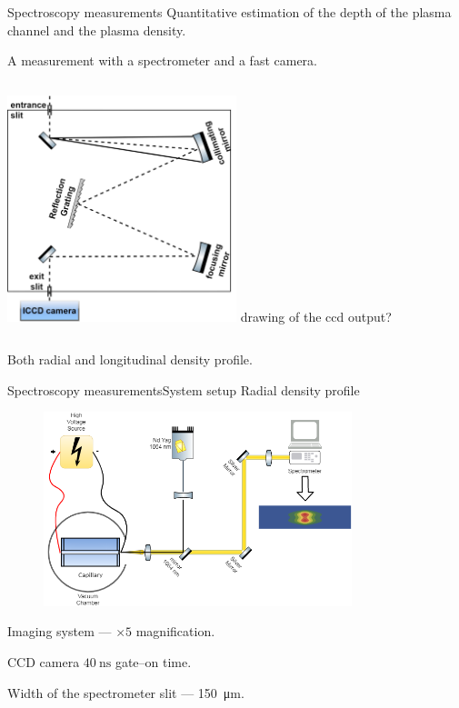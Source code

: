 \documentclass[]{beamer}
\begin{document}
  \begin{frame}{Spectroscopy measurements}
    Quantitative estimation of the depth of the plasma channel and the plasma density.

    A measurement with a spectrometer and a fast camera.
    \begin{columns}
          \includegraphics[width=0.5\textwidth]{figures/results/spectro/spectrometer.png}
      drawing of the ccd output?
    \end{columns}
    Both radial and longitudinal density profile.
  \end{frame}
  \begin{frame}{Spectroscopy measurements}{System setup}
Radial density profile
\begin{figure}
  \includegraphics[width=0.8\textwidth]{figures/results/spectro/radial_system.png}
\end{figure}
Imaging system --- $\times 5$ magnification.

CCD camera $\SI{40}{\ns}$ gate--on time. 

Width of the spectrometer slit --- \SI{150}{\um}.
  \end{frame}
\end{document}
